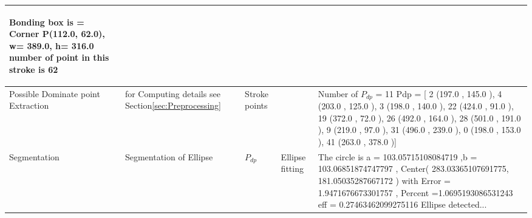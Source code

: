 \begin{landscape}
\begin{scriptsize}
\begin{longtable}{|p{2cm}|p{2cm}|p{2cm}|p{2cm}|p{13cm}|}
\begin{scriptsize}
 Bonding box is  = Corner P(112.0, 62.0), w= 389.0, h=  316.0
 number of point in this stroke is   62
\end{scriptsize}
 \\ \hline
Possible Dominate point Extraction & for Computing details see Section\ref{sec:Preprocessing} &  Stroke points  &   &    Number of $P_{dp}$  = 11
 Pdp = [ 2 (197.0 , 145.0 ), 4 (203.0 , 125.0 ), 3 (198.0 , 140.0 ), 22 (424.0 , 91.0 ), 19 (372.0 , 72.0 ), 26 (492.0 , 164.0 ), 28 (501.0 , 191.0 ), 9 (219.0 , 97.0 ), 31 (496.0 , 239.0 ), 0 (198.0 , 153.0 ), 41 (263.0 , 378.0 )]

\\ \hline 
Segmentation & Segmentation of Ellipse & $P_{dp}$   &  Ellipse fitting  & 
 
  The circle is   a = 103.05715108084719 ,b = 103.06851874747797 , Center( 283.03365107691775,  181.05035287667172 )   with Error =  1.9471676673301757 , Percent =1.0695193086531243
eff  = 0.27463462099275116  
 Ellipse detected... 
 
 \\ \hline
 

\end{longtable}
\end{scriptsize}
\end{landscape}
